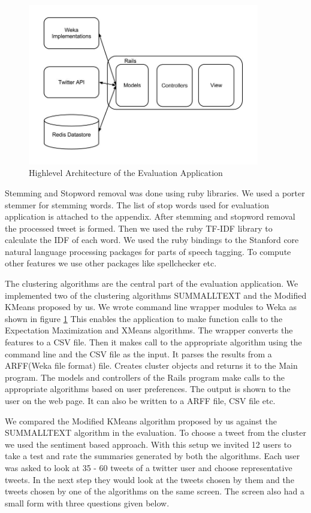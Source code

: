 \begin{figure}[hbtp]
\centering
\includegraphics[width=0.9\textwidth]{Chapter-5/figs/evaluation_app_arch}
\caption{Highlevel Architecture of the Evaluation Application}
\label{fig:evalapp1}
\end{figure}

Stemming and Stopword removal was done using ruby libraries. We used a porter stemmer for stemming words. The list of stop words used for evaluation application is attached to the appendix. After stemming and stopword removal the processed tweet is formed. Then we used the ruby TF-IDF library to calculate the IDF of each word. We used the ruby bindings to the Stanford core natural language processing packages for parts of speech tagging. To compute other features we use other packages like spellchecker etc. 

The clustering algorithms are the central part of the evaluation application. We implemented two of the clustering algorithms SUMMALLTEXT and the Modified KMeans proposed by us. We wrote command line wrapper modules to Weka as shown in figure \ref{fig:evalapp1} This enables the application to make function calls to the Expectation Maximization and XMeans algorithms. The wrapper converts the features to a CSV file. Then it makes call to the appropriate algorithm using the command line and the CSV file as the input. It parses the results from a ARFF(Weka file format) file. Creates cluster objects and returns it to the Main program. The models and controllers of the Rails program make calls to the appropriate algorithms based on user preferences. The output is shown to the user on the web page. It can  also be written to a ARFF file, CSV file etc. 

We compared the Modified KMeans algorithm proposed by us against the SUMMALLTEXT algorithm in the evaluation. To choose a tweet from the cluster we used the sentiment based approach. With this setup we invited 12 users to take a test and rate the summaries generated by both the algorithms. Each user was asked to look at 35 - 60 tweets of a twitter user and choose representative tweets. In the next step they would look at the tweets chosen by them and the tweets chosen by one of the algorithms on the same screen. The screen also had a small form with three questions given below. 

